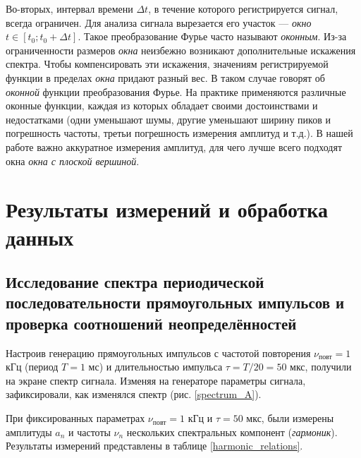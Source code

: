 \documentclass[a4paper, 12pt]{article}
\begin{document}
    Во-вторых, интервал времени $\Delta t$, в течение которого регистрируется сигнал, всегда ограничен. Для анализа сигнала вырезается его участок — \textit{окно} $t \in [t_0; t_0 + \Delta t]$. Такое преобразование Фурье часто называют \textit{оконным}. Из-за ограниченности размеров \textit{окна} неизбежно возникают дополнительные искажения спектра. Чтобы компенсировать эти искажения, значениям регистрируемой функции в пределах \textit{окна} придают разный вес. В таком случае говорят об \textit{оконной} функции преобразования Фурье. На практике применяются различные оконные функции, каждая из которых обладает своими достоинствами и недостатками (одни уменьшают шумы, другие уменьшают ширину пиков и погрешность частоты, третьи погрешность измерения амплитуд и т.д.). В нашей работе важно аккуратное измерения амплитуд, для чего лучше всего подходят окна \textit{окна с плоской вершиной}.

    \section{Результаты измерений и обработка данных}

    \subsection{Исследование спектра периодической последовательности прямоугольных импульсов и проверка соотношений неопределённостей}

    Настроив генерацию прямоугольных импульсов с частотой повторения $\nu_\text{повт} = 1$ кГц (период $T = 1$ мс) и длительностью импульса $\tau = T/20 = 50$  мкс, получили на экране спектр сигнала. Изменяя на генераторе параметры сигнала, зафиксировали, как изменялся спектр (рис. \ref{spectrum_A}).

    При фиксированных параметрах $\nu_\text{повт} = 1$ кГц и $\tau = 50$ мкс, были измерены амплитуды $a_n$ и частоты $\nu_n$ нескольких спектральных компонент (\textit{гармоник}). Результаты измерений представлены в таблице \ref{harmonic_relations}. 
\end{document}
